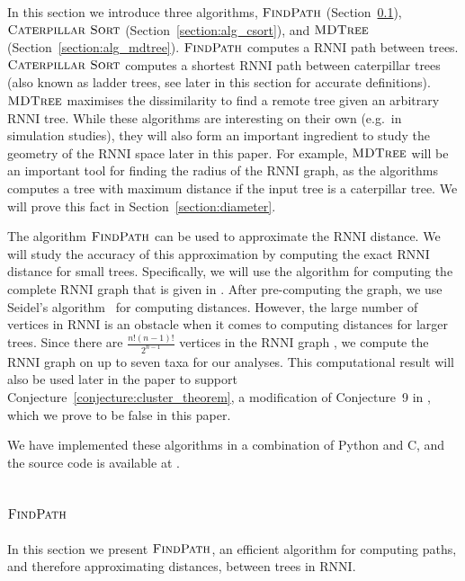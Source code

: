 \documentclass{amsart}
\newcommand{\rnni}{\mathrm{RNNI}}
\newcommand{\csort}{\textsc{Caterpillar Sort}}
\newcommand{\findpath}{\textsc{FindPath}}
\newcommand{\mdtree}{\textsc{MDTree}}
\begin{document}
In this section we introduce three algorithms, $\findpath$ (Section~\ref{section:alg_findpath}), $\csort$ (Section~\ref{section:alg_csort}), and $\mdtree$ (Section~\ref{section:alg_mdtree}).
$\findpath$ computes a $\rnni$ path between trees.
$\csort$ computes a shortest $\rnni$ path between caterpillar trees (also known as ladder trees, see later in this section for accurate definitions).
$\mdtree$ maximises the dissimilarity to find a remote tree given an arbitrary $\rnni$ tree.
While these algorithms are interesting on their own (e.g.\ in simulation studies), they will also form an important ingredient to study the geometry of the $\rnni$ space later in this paper.
For example, $\mdtree$ will be an important tool for finding the radius of the $\rnni$ graph, as the algorithms computes a tree with maximum distance if the input tree is a caterpillar tree.
We will prove this fact in Section~\ref{section:diameter}.

The algorithm $\findpath$ can be used to approximate the $\rnni$ distance.
We will study the accuracy of this approximation by computing the exact $\rnni$ distance for small trees.
Specifically, we will use the algorithm for computing the complete $\rnni$ graph that is given in \autocite[their Section 3.3]{Gavryushkin2018-ol}.
After pre-computing the graph, we use Seidel's algorithm~\autocite{seidel_all-pairs-shortest-path_1995} for computing distances.
However, the large number of vertices in $\rnni$ is an obstacle when it comes to computing distances for larger trees.
Since there are $\frac{n!(n-1)!}{2^{n-1}}$ vertices in the $\rnni$ graph \autocite{Gavryushkin2018-ol}, we compute the $\rnni$ graph on up to seven taxa for our analyses.
This computational result will also be used later in the paper to support Conjecture~\ref{conjecture:cluster_theorem}, a modification of Conjecture~9 in \autocite{Gavryushkin2018-ol}, which we prove to be false in this paper.

We have implemented these algorithms in a combination of Python and C, and the source code is available at \autocite{Collienne2019}.


\subsection{$\findpath$}
\label{section:alg_findpath}

In this section we present $\findpath$, an efficient algorithm for computing paths, and therefore approximating distances, between trees in $\rnni$.
\end{document}
